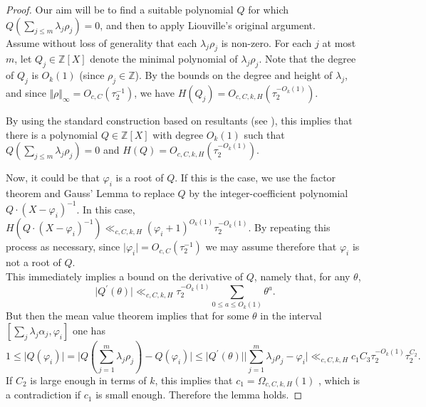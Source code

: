 \documentclass[12pt,a4paper,twoside,reqno]{amsart}
\numberwithin{equation}{section}
\begin{document}
\begin{proof}
Our aim will be to find a suitable polynomial $Q$ for which $Q(\sum_{j \leqslant m} \lambda_j\rho_j) = 0$, and then to apply Liouville's original argument.\\

Assume without loss of generality that each $\lambda_j\rho_j$ is non-zero. For each $j$ at most $m$, let $Q_j\in\mathbb{Z}[X]$ denote the minimal polynomial of $\lambda_j\rho_j$. Note that the degree of $Q_j$ is $O_{k}(1)$ (since $\rho_j\in\mathbb{Z}$). By the bounds on the degree and height of $\lambda_j$, and since $\Vert \rho\Vert_\infty  = O_{c,C} (\tau_2^{-1})$, we have $H(Q_j) = O_{c,C,k,H}(\tau_2^{-O_k(1)})$. 

By using the standard construction based on resultants (see \cite[Section 4.2.1]{Co93}), this implies that there is a polynomial $Q\in \mathbb{Z}[X]$ with degree $O_k(1)$ such that\\ $Q(\sum_{j \leqslant m} \lambda_j\rho_j) = 0$ and $H(Q) = O_{c,C,k,H}( \tau_2^{-O_k(1)})$. 

Now, it could be that $\varphi_i$ is a root of $Q$. If this is the case, we use the factor theorem and Gauss' Lemma to replace $Q$ by the integer-coefficient polynomial $Q\cdot (X-\varphi_i)^{-1}$. In this case, $H( Q\cdot(X-\varphi_i)^{-1})\ll_{c,C,k,H} (\varphi_i + 1)^{O_k(1)}\tau_2^{-O_k(1)}$. By repeating this process as necessary, since $\vert \varphi_i\vert  = O_{c,C} (\tau_2^{-1})$ we may assume therefore that $\varphi_i$ is not a root of $Q$.\\

This immediately implies a bound on the derivative of $Q$, namely that, for any $\theta$, \[\vert Q^\prime (\theta)\vert \ll_{c,C,k,H} \tau_2^{-O_k(1)}\sum\limits_{0\leqslant a \leqslant O_k(1)} \theta^a.\] But then the mean value theorem implies that for some $\theta$ in the interval \\$[\sum_j\lambda_j\alpha_j, \varphi_i]$ one has \[1\leqslant \vert Q(\varphi_i)\vert = \vert Q(\sum\limits_{j=1}^{m}\lambda_j\rho_j) - Q(\varphi_i)\vert \leqslant  \vert Q^\prime (\theta)\vert \vert \sum\limits_{j=1}^{m}\lambda_j\rho_j - \varphi_i\vert\ll_{c,C,k,H} c_1C_3 \tau_2^{-O_k(1)} \tau_2^{C_2}. \] If $C_2$ is large enough in terms of $k$, this implies that $c_1 = \Omega_{c,C,k,H} (1)$ , which is a contradiction if $c_1$ is small enough. Therefore the lemma holds. 
\end{proof}



\end{document}
